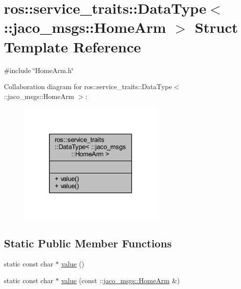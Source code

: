 \hypertarget{structros_1_1service__traits_1_1DataType_3_01_1_1jaco__msgs_1_1HomeArm_01_4}{}\section{ros\+:\+:service\+\_\+traits\+:\+:Data\+Type$<$ \+:\+:jaco\+\_\+msgs\+:\+:Home\+Arm $>$ Struct Template Reference}
\label{structros_1_1service__traits_1_1DataType_3_01_1_1jaco__msgs_1_1HomeArm_01_4}


{\ttfamily \#include \char`\"{}Home\+Arm.\+h\char`\"{}}



Collaboration diagram for ros\+:\+:service\+\_\+traits\+:\+:Data\+Type$<$ \+:\+:jaco\+\_\+msgs\+:\+:Home\+Arm $>$\+:
\nopagebreak
\begin{figure}[H]
\begin{center}
\leavevmode
\includegraphics[width=206pt]{d7/d1a/structros_1_1service__traits_1_1DataType_3_01_1_1jaco__msgs_1_1HomeArm_01_4__coll__graph}
\end{center}
\end{figure}
\subsection*{Static Public Member Functions}
\begin{DoxyCompactItemize}
\item 
static const char $\ast$ \hyperlink{structros_1_1service__traits_1_1DataType_3_01_1_1jaco__msgs_1_1HomeArm_01_4_acbc0e45eed97b41dd1eae5097f37c936}{value} ()
\item 
static const char $\ast$ \hyperlink{structros_1_1service__traits_1_1DataType_3_01_1_1jaco__msgs_1_1HomeArm_01_4_a08ea5ed49ad956bb0822b6dc20b6024d}{value} (const \+::\hyperlink{namespacejaco__msgs_d2/d3e/structjaco__msgs_1_1HomeArm}{jaco\+\_\+msgs\+::\+Home\+Arm} \&)
\end{DoxyCompactItemize}


